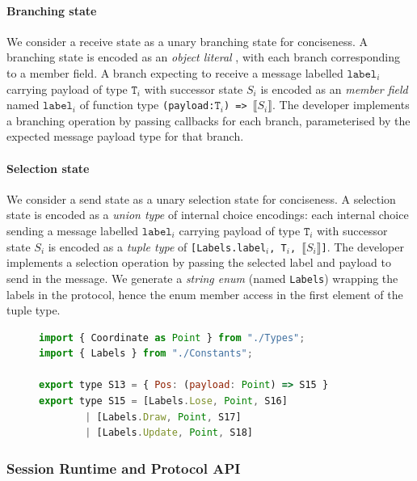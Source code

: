 \documentclass[submission,copyright,creativecommons]{eptcs}
\begin{document}
\paragraph{Branching state} We consider a receive state as a unary branching state for conciseness. A branching state is encoded as an \textit{object literal} \cite{TypeScriptSpec}, with each branch corresponding to a member field. A branch expecting to receive a message labelled $\texttt{label}_i$ carrying payload of type $\texttt{T}_i$ with successor state $S_i$ is encoded as an \textit{member field} named $\texttt{label}_i$ of function type \texttt{(payload:$\texttt{T}_i$) => $\llbracket S_i \rrbracket$}. The developer implements a branching operation by passing callbacks for each branch, parameterised by the expected message payload type for that branch.

\paragraph{Selection state} We consider a send state as a unary selection state for conciseness. A selection state is encoded as a \textit{union type} \cite{TypeScriptSpec} of internal choice encodings: each internal choice sending a message labelled $\texttt{label}_i$ carrying payload of type $\texttt{T}_i$ with successor state $S_i$ is encoded as a \textit{tuple type} of \texttt{[Labels.label$_i$, T$_i$, $\llbracket S_i \rrbracket$]}. The developer implements a selection operation by passing the selected label and payload to send in the message. We generate a \textit{string enum} (named \texttt{Labels}) wrapping the labels in the protocol, hence the enum member access in the first element of the tuple type.

\begin{figure}[!h]
\begin{lstlisting}[language=JavaScript, title=\texttt{./NoughtsAndCrosses/Game.ts}]
import { Coordinate as Point } from "./Types";
import { Labels } from "./Constants";

export type S13 = { Pos: (payload: Point) => S15 }
export type S15 = [Labels.Lose, Point, S16]
		| [Labels.Draw, Point, S17]
		| [Labels.Update, Point, S18]
\end{lstlisting}  
\label{lst:svr}
\end{figure}

\subsubsection{Session Runtime and Protocol API}
\label{section:serversessionapi}
\end{document}
